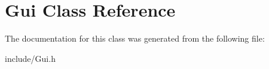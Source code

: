 \hypertarget{classGui}{}\section{Gui Class Reference}
\label{classGui}


The documentation for this class was generated from the following file\+:\begin{DoxyCompactItemize}
\item 
include/Gui.\+h\end{DoxyCompactItemize}
